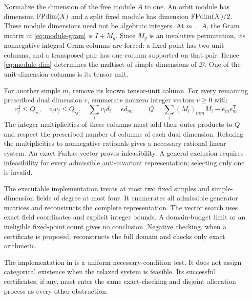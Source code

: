 Normalize the dimension of the free module $A$ to one. An orbit module
has dimension $\operatorname{FPdim}(X)$ and a split fixed module has dimension
$\operatorname{FPdim}(X)/2$. These module dimensions need not be algebraic integers.
At $m=A$, the Gram matrix in \eqref{eq:module-gram} is $I+M_g$.
Since $M_g$ is an involutive permutation, its nonnegative integral Gram
columns are forced: a fixed point has two unit columns, and a transposed
pair has one column supported on that pair. Hence
\eqref{eq:module-dim} determines the multiset of simple dimensions of
$\mathcal D$. One of the unit-dimension columns is its tensor unit.

For another simple $m$, remove its known tensor-unit column. For every
remaining prescribed dual dimension $e$, enumerate nonzero integer
vectors $v\ge0$ with
\[
 v_i^2\le Q_{ii},\quad v_iv_j\le Q_{ij},\quad
 \sum_i v_i d_i=e d_m,
 \qquad Q=\sum_i(M_i)_{mm}M_i-e_me_m^{\mathsf T}.
\]
The integer multiplicities of these columns must add their outer
products to $Q$ and respect the prescribed number of columns of each
dual dimension. Relaxing the multiplicities to nonnegative rationals
gives a necessary rational linear system. An exact Farkas vector proves
infeasibility. A general exclusion requires infeasibility for every
admissible anti-invariant representation; selecting only one is invalid.

The executable implementation treats at most two fixed simples and
simple-dimension fields of degree at most four. It enumerates all
admissible generator matrices and reconstructs the complete representation.
The vector search uses exact field coordinates and explicit integer
bounds. A domain-budget limit or an ineligible fixed-point count gives
no conclusion. Negative checking, when a certificate is proposed,
reconstructs the full domain and checks only exact arithmetic.


The implementation in  is a
uniform necessary-condition test. It does not assign categorical
existence when the relaxed system is feasible. Its successful
certificates, if any, must enter the same exact-checking and disjoint
allocation process as every other obstruction.









